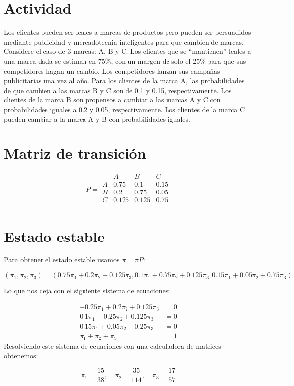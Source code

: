 \documentclass{article}
\begin{document}
\section*{Actividad}
Los clientes pueden ser leales a marcas de productos pero pueden ser persuadidos mediante publicidad y mercadotecnia inteligentes para que cambien de marcas. Considere el caso de 3 marcas: A, B y C. Los clientes que se “mantienen” leales a una marca dada se estiman en 75\%, con un margen de solo el 25\% para que sus competidores hagan un cambio. Los competidores lanzan sus campañas publicitarias una vez al año. Para los clientes de la marca A, las probabilidades de que cambien a las marcas B y C son de 0.1 y 0.15, respectivamente. Los clientes de la marca B son propensos a cambiar a las marcas A y C con probabilidades iguales a 0.2 y 0.05, respectivamente. Los clientes de la marca C pueden cambiar a la marca A y B con probabilidades iguales.

\section*{Matriz de transición}

$$
	P =
	\begin{array}{c|ccc}
		  & A     & B     & C    \\
		\hline
		A & 0.75  & 0.1   & 0.15 \\
		B & 0.2   & 0.75  & 0.05 \\
		C & 0.125 & 0.125 & 0.75 \\
	\end{array}
$$
\section*{Estado estable}

Para obtener el estado estable usamos $\pi = \pi P$:

$$
	(\pi_1, \pi_2, \pi_3) = (
	0.75\pi_1 + 0.2\pi_2 + 0.125\pi_3,
	0.1\pi_1 +0.75\pi_2 + 0.125\pi_3,
	0.15\pi_1 + 0.05\pi_2 + 0.75\pi_3
	)
$$

Lo que nos deja con el siguiente sistema de ecuaciones:

$$
	\begin{aligned}
		-0.25\pi_1 + 0.2\pi_2 + 0.125\pi_3 & = 0 \\
		0.1\pi_1 - 0.25\pi_2 + 0.125\pi_3  & = 0 \\
		0.15\pi_1 + 0.05\pi_2 - 0.25\pi_3  & = 0 \\
		\pi_1 + \pi_2 + \pi_3              & = 1
	\end{aligned}
$$
Resolviendo este sistema de ecuaciones con una calculadora de matrices obtenemos:

$$
	\pi_1 = \frac{15}{38}, \quad \pi_2 = \frac{35}{114}, \quad \pi_3 = \frac{17}{57}
$$
\end{document}
